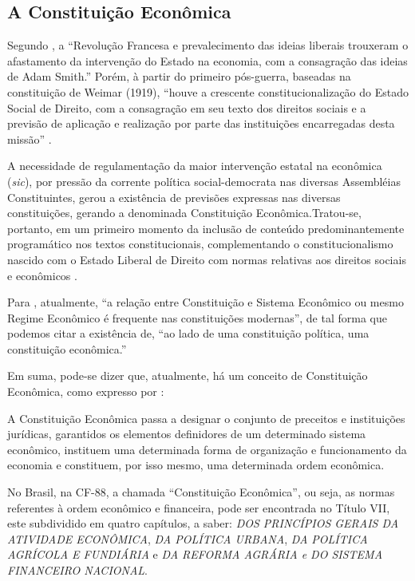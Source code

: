 \documentclass[
	10pt,				%
	openright,			%
	twoside,			%
	a5paper,			%
	english,			%
	french,				%
	spanish,			%
	brazil				%
	]{abntex2}
\renewenvironment{quote}
  {\small\list{}{\rightmargin=0.1cm \leftmargin=4cm}%
   \item\relax}
  {\endlist}
\begin{document}
\subsection{A Constituição
Econômica}\label{a-constituiuxe7uxe3o-econuxf4mica}

Segundo , a ``Revolução Francesa e
prevalecimento das ideias liberais trouxeram o afastamento da
intervenção do Estado na economia, com a consagração das ideias de Adam
Smith.'' Porém, à partir do primeiro pós-guerra, baseadas na
constituição de Weimar (1919), ``houve a crescente constitucionalização
do Estado Social de Direito, com a consagração em seu texto dos direitos
sociais e a previsão de aplicação e realização por parte das
instituições encarregadas desta missão'' \cite[p.~859]{moraes}.

\begin{quote}
A necessidade de regulamentação da maior intervenção estatal na
econômica (\emph{sic}), por pressão da corrente política
social-democrata nas diversas Assembléias Constituintes, gerou a
existência de previsões expressas nas diversas constituições, gerando a
denominada Constituição Econômica.Tratou-se, portanto, em um primeiro
momento da inclusão de conteúdo predominantemente programático nos
textos constitucionais, complementando o constitucionalismo nascido com
o Estado Liberal de Direito com normas relativas aos direitos sociais e
econômicos \cite[p.~859]{moraes}.
\end{quote}

Para , atualmente, ``a relação entre
Constituição e Sistema Econômico ou mesmo Regime Econômico é frequente
nas constituições modernas'', de tal forma que podemos citar a
existência de, ``ao lado de uma constituição política, uma constituição
econômica.''

Em suma, pode-se dizer que, atualmente, há um conceito de Constituição
Econômica, como expresso por :

\begin{quote}
A Constituição Econômica passa a designar o conjunto de preceitos e
instituições jurídicas, garantidos os elementos definidores de um
determinado sistema econômico, instituem uma determinada forma de
organização e funcionamento da economia e constituem, por isso mesmo,
uma determinada ordem econômica.
\end{quote}

No Brasil, na CF-88, a chamada ``Constituição Econômica'', ou seja, as
normas referentes à ordem econômico e financeira, pode ser encontrada no
Título VII, este subdividido em quatro capítulos, a saber: \emph{DOS
PRINCÍPIOS GERAIS DA ATIVIDADE ECONÔMICA}, \emph{DA POLÍTICA URBANA},
\emph{DA POLÍTICA AGRÍCOLA E FUNDIÁRIA} e \emph{DA REFORMA AGRÁRIA e DO
SISTEMA FINANCEIRO NACIONAL}.
\end{document}
